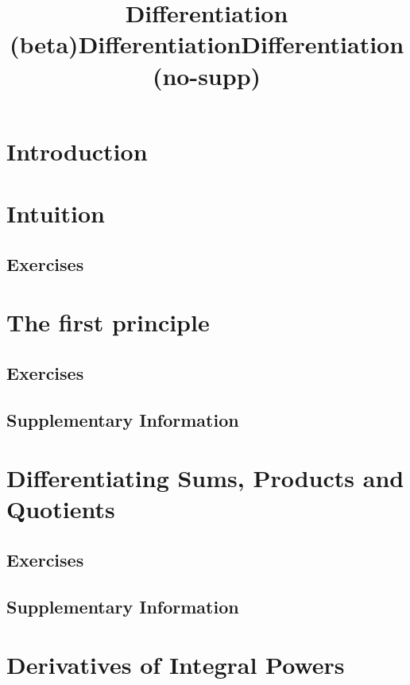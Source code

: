 \documentclass{fts_m2}
\title{Differentiation (beta)}
\title{Differentiation}
\title{Differentiation (no-supp)}
\begin{document}
    \maketitle
    \section*{Introduction}
    
    \tableofcontents

    \section{Intuition}
    
    \subsection*{Exercises}
      
    
    \section{The first principle}
    
    \subsection*{Exercises}
    
    \ifcompilesupp
    \subsection*{Supplementary Information}
    
    \fi

    \section{Differentiating Sums, Products and Quotients}
    
    \subsection*{Exercises}
    
    \ifcompilesupp
    \subsection*{Supplementary Information}
    
    \fi

    \section{Derivatives of Integral Powers}
    
\end{document}
